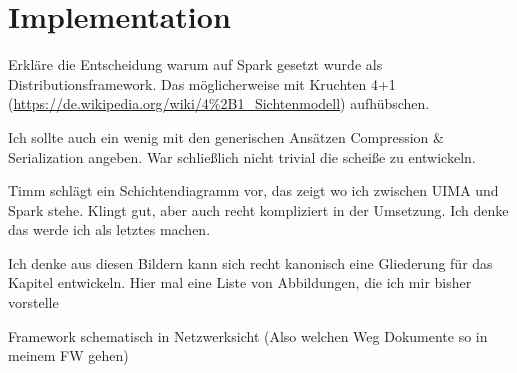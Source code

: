 \chapter{Implementation}
\label{ch:implementation}

Erkläre die Entscheidung warum auf Spark gesetzt wurde als Distributionsframework. Das möglicherweise mit Kruchten 4+1 (\url{https://de.wikipedia.org/wiki/4\%2B1_Sichtenmodell})  aufhübschen.

Ich sollte auch ein wenig mit den generischen Ansätzen Compression \& Serialization angeben. War schließlich nicht trivial die scheiße zu entwickeln.

Timm schlägt ein Schichtendiagramm vor, das zeigt wo ich zwischen UIMA und Spark stehe. Klingt gut, aber auch recht kompliziert in der Umsetzung. Ich denke das werde ich als letztes machen.

Ich denke aus diesen Bildern kann sich recht kanonisch eine Gliederung für das Kapitel entwickeln. Hier mal eine Liste von Abbildungen, die ich mir bisher vorstelle

Framework schematisch in Netzwerksicht (Also welchen Weg Dokumente so in meinem FW gehen)


